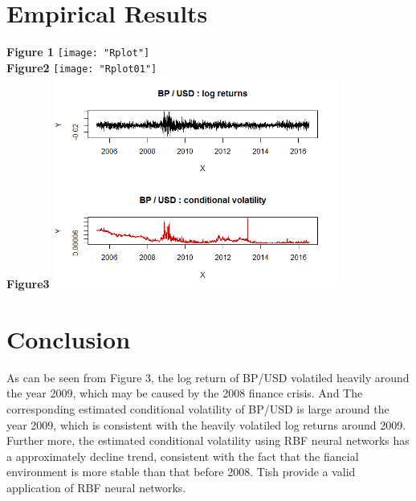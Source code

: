 \documentclass{article}
\begin{document}
\begin{spacing}{2.0}
\section{Empirical Results}
\textbf{Figure 1}
\texttt{[image: "Rplot"]}\\
\textbf{Figure2}
\texttt{[image: "Rplot01"]}\\
\textbf{Figure3}
\includegraphics[height=7cm]{"Rplot02"}
\section{Conclusion}
As can be seen from Figure 3, the log return of BP/USD volatiled heavily around the year 2009, which may be caused by the 2008 finance crisis. And The corresponding estimated conditional volatility of BP/USD is large around the year 2009, which is consistent with the heavily volatiled log returns around 2009. Further more, the estimated conditional volatility using RBF neural networks has a approximately decline trend, consistent with the fact that the fiancial environment is more stable than that before 2008. Tish provide a valid application of RBF neural networks.
\end{spacing}
\end{document}
